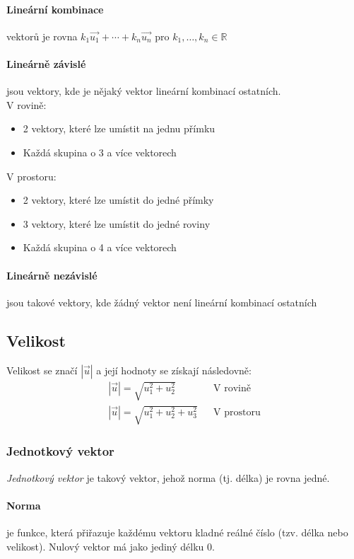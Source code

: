 \documentclass[12pt]{article}
\begin{document}
\paragraph{Lineární kombinace} vektorů je rovna $k_1 \vec{u_1} + \dotsb + k_n \vec{u_n}$ pro $k_1, \dotsc, k_n \in \mathbb{R}$
\paragraph{Lineárně závislé} jsou vektory, kde je nějaký vektor lineární kombinací ostatních.\\
V rovině:
\begin{itemize}
\item 2 vektory, které lze umístit na jednu přímku
\item Každá skupina o 3 a více vektorech
\end{itemize}
V prostoru:
\begin{itemize}
\item 2 vektory, které lze umístit do jedné přímky
\item 3 vektory, které lze umístit do jedné roviny
\item Každá skupina o 4 a více vektorech
\end{itemize}
\paragraph{Lineárně nezávislé} jsou takové vektory, kde žádný vektor není lineární kombinací ostatních
\subsection{Velikost}
Velikost se značí $|\vec{u}|$ a její hodnoty se získají následovně:
\begin{align}
|\vec{u}| = \sqrt{u_1^2 + u_2^2 } && \text{V rovině}\\
|\vec{u}| = \sqrt{u_1^2 + u_2^2 + u_3^2 }&& \text{V prostoru}
\end{align}
\subsubsection{Jednotkový vektor}
\emph{Jednotkový vektor} je takový vektor, jehož norma (tj. délka) je rovna jedné.
\paragraph{Norma} je funkce, která přiřazuje každému vektoru kladné reálné číslo (tzv. délka nebo velikost). Nulový vektor má jako jediný délku 0. 
\end{document}
